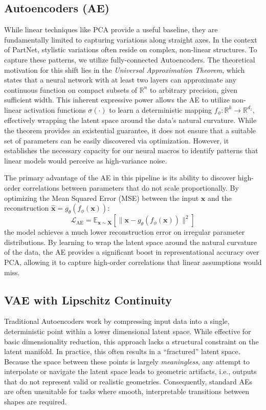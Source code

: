 \documentclass{thesis}
\begin{document}
\subsection{Autoencoders (AE)}

While linear techniques like PCA provide a useful baseline, they are fundamentally limited to capturing variations along straight axes. In the context of PartNet, stylistic variations often reside on complex, non-linear structures. To capture these patterns, we utilize fully-connected Autoencoders. The theoretical motivation for this shift lies in the \textit{Universal Approximation Theorem}, which states that a neural network with at least two layers can approximate any continuous function on compact subsets of $\mathbb{R}^n$ to arbitrary precision, given sufficient width. This inherent expressive power allows the AE to utilize non-linear activation functions $\sigma(\cdot)$ to learn a deterministic mapping $f_\phi: \mathbb{R}^k \to \mathbb{R}^{d_z}$, effectively wrapping the latent space around the data's natural curvature. While the theorem provides an existential guarantee, it does not ensure that a suitable set of parameters can be easily discovered via optimization. However, it establishes the necessary capacity for our neural macros to identify patterns that linear models would perceive as high-variance noise.

The primary advantage of the AE in this pipeline is its ability to discover high-order correlations between parameters that do not scale proportionally. By optimizing the Mean Squared Error (MSE) between the input $\mathbf{x}$ and the reconstruction $\hat{\mathbf{x}} = g_\theta(f_\phi(\mathbf{x}))$:
\begin{equation}
    \mathcal{L}_{\text{AE}} = \mathbb{E}_{\mathbf{x} \sim \mathbf{X}} \left[ \| \mathbf{x} - g_\theta(f_\phi(\mathbf{x})) \|^2 \right]
\end{equation}
the model achieves a much lower reconstruction error on irregular parameter distributions. By learning to wrap the latent space around the natural curvature of the data, the AE provides a significant boost in representational accuracy over PCA, allowing it to capture high-order correlations that linear assumptions would miss.

\subsection{VAE with Lipschitz Continuity}


Traditional Autoencoders work by compressing input data into a single, deterministic point within a lower dimensional latent space. While effective for basic dimensionality reduction, this approach lacks a structural constraint on the latent manifold. In practice, this often results in a ``fractured'' latent space. Because the space between these points is largely \textit{meaningless}, any attempt to interpolate or navigate the latent space leads to geometric artifacts, i.e., outputs that do not represent valid or realistic geometries. Consequently, standard AEs are often unsuitable for tasks where smooth, interpretable transitions between shapes are required.
\end{document}
